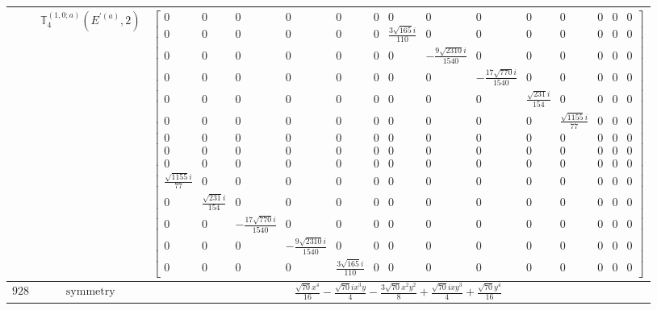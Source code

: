 \documentclass[fleqn,8pt,landscape]{jsarticle}
\begin{document}
\begin{longtable}{ccc}
$  $ & $ \mathbb{T}_{4}^{(1,0;a)}(E^{\prime(a)},2) $ & $ \begin{bmatrix} 0 & 0 & 0 & 0 & 0 & 0 & 0 & 0 & 0 & 0 & 0 & 0 & 0 & 0 \\ 0 & 0 & 0 & 0 & 0 & 0 & \frac{3 \sqrt{165} i}{110} & 0 & 0 & 0 & 0 & 0 & 0 & 0 \\ 0 & 0 & 0 & 0 & 0 & 0 & 0 & - \frac{9 \sqrt{2310} i}{1540} & 0 & 0 & 0 & 0 & 0 & 0 \\ 0 & 0 & 0 & 0 & 0 & 0 & 0 & 0 & - \frac{17 \sqrt{770} i}{1540} & 0 & 0 & 0 & 0 & 0 \\ 0 & 0 & 0 & 0 & 0 & 0 & 0 & 0 & 0 & \frac{\sqrt{231} i}{154} & 0 & 0 & 0 & 0 \\ 0 & 0 & 0 & 0 & 0 & 0 & 0 & 0 & 0 & 0 & \frac{\sqrt{1155} i}{77} & 0 & 0 & 0 \\ 0 & 0 & 0 & 0 & 0 & 0 & 0 & 0 & 0 & 0 & 0 & 0 & 0 & 0 \\ 0 & 0 & 0 & 0 & 0 & 0 & 0 & 0 & 0 & 0 & 0 & 0 & 0 & 0 \\ 0 & 0 & 0 & 0 & 0 & 0 & 0 & 0 & 0 & 0 & 0 & 0 & 0 & 0 \\ \frac{\sqrt{1155} i}{77} & 0 & 0 & 0 & 0 & 0 & 0 & 0 & 0 & 0 & 0 & 0 & 0 & 0 \\ 0 & \frac{\sqrt{231} i}{154} & 0 & 0 & 0 & 0 & 0 & 0 & 0 & 0 & 0 & 0 & 0 & 0 \\ 0 & 0 & - \frac{17 \sqrt{770} i}{1540} & 0 & 0 & 0 & 0 & 0 & 0 & 0 & 0 & 0 & 0 & 0 \\ 0 & 0 & 0 & - \frac{9 \sqrt{2310} i}{1540} & 0 & 0 & 0 & 0 & 0 & 0 & 0 & 0 & 0 & 0 \\ 0 & 0 & 0 & 0 & \frac{3 \sqrt{165} i}{110} & 0 & 0 & 0 & 0 & 0 & 0 & 0 & 0 & 0 \end{bmatrix} $ \\ \hline
$ 928 $ & $ \text{symmetry} $ & $ \frac{\sqrt{70} x^{4}}{16} - \frac{\sqrt{70} i x^{3} y}{4} - \frac{3 \sqrt{70} x^{2} y^{2}}{8} + \frac{\sqrt{70} i x y^{3}}{4} + \frac{\sqrt{70} y^{4}}{16} $ \\

\end{longtable}
\end{document}
